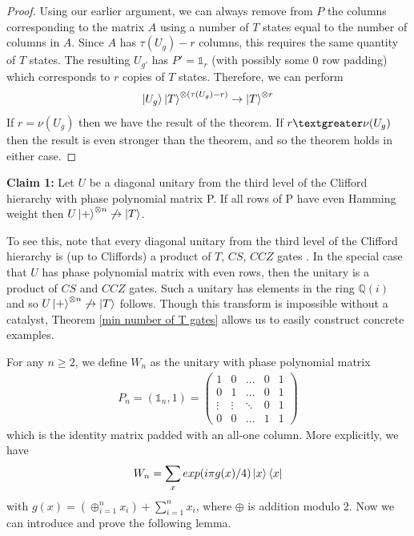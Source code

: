 \documentclass[12pt]{dalthesis}
\begin{document}
\begin{proof}
Using our earlier argument, we can always remove from $P$ the columns corresponding to the matrix $A$ using a number of $T$ states equal to the number of columns in $A$. Since $A$ has $\tau (U_g) - r$ columns, this requires the same quantity of $T$ states. The resulting $U_{g'}$ has $P' = \mathds{1}_r$ (with possibly some 0 row padding) which corresponds to $r$ copies of $T$ states. Therefore, we can perform 
\begin{equation}
\ket{U_g}\ket{T}^{\otimes (\tau (U_g) - r)} \rightarrow \ket{T}^{\otimes r}
\end{equation}
If $r = \nu (U_g)$ then we have the result of the theorem. If $r \textgreater \nu (U_g)$ then the result is even stronger than the theorem, and so the theorem holds in either case.
\end{proof}



\textbf{Claim 1:} Let $U$ be a diagonal unitary from the third level of the Clifford hierarchy with phase polynomial matrix P. If all rows of P have even Hamming weight then $U\ket{+}^{\otimes n} \not \rightarrow \ket{T}$.

To see this, note that every diagonal unitary from the third level of the Clifford hierarchy is (up to Cliffords) a product of $T$, $CS$, $CCZ$ gates \cite{}. In the special case that $U$ has phase polynomial matrix with even rows, then the unitary is a product of $CS$ and $CCZ$ gates. Such a unitary has elements in the ring $\mathbb{Q}(i)$ and so $U\ket{+}^{\otimes n} \not \rightarrow \ket{T}$ follows. Though this transform is impossible without a catalyst, Theorem \ref{min number of T gates} allows us to easily construct concrete examples.

For any $n \geq 2$, we define $W_n$ as the unitary with phase polynomial matrix
\begin{align*}
P_n = (\mathds{1}_n, 1) =
\begin{pmatrix}
1 & 0 & \dots & 0 & 1 \\
0 & 1 & \dots & 0 & 1 \\
\vdots & \vdots & \ddots & 0 & 1 \\
0 & 0 & \dots & 1 & 1
\end{pmatrix}
\end{align*}
which is the identity matrix padded with an all-one column. More explicitly, we have 
\begin{equation}
W_n = \sum_x exp(i\pi g(x)/4)\ket{x}\bra{x}
\end{equation}
with $g(x) = (\oplus_{i=1}^n x_i) + \sum_{i=1}^n x_i$, where $\oplus$ is addition modulo 2. Now we can introduce and prove the following lemma.
\end{document}
